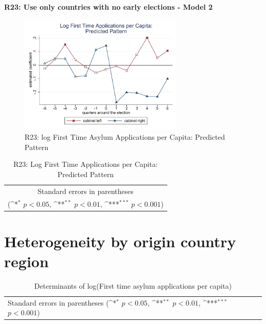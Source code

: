 \documentclass[10pt,a4paper]{scrartcl}
\begin{document}
\clearpage
\textbf{R23: Use only countries with no early elections - Model 2}
\begin{figure}[!ht]
	\centering
	\includegraphics[width=0.7\textwidth]{figures_edited/app_graph2_R23.pdf}
	\caption{R23: log First Time Asylum Applications per Capita: Predicted Pattern}
\end{figure}

\begin{table}[!ht]\centering
	\footnotesize
	\renewcommand{\arraystretch}{1.2}
	\def\sym#1{\ifmmode^{#1}\else\(^{#1}\)\fi}
	\caption{R23: Log First Time Applications per Capita: Predicted Pattern}
	\begin{tabular}{l*{2}{c}}
		\hline\hline
		
		\hline\hline
		\multicolumn{3}{c}{\footnotesize Standard errors in parentheses} \\
		\multicolumn{3}{c}{\footnotesize (\sym{*} \(p<0.05\), \sym{**} \(p<0.01\), \sym{***} \(p<0.001\))} \\
	\end{tabular}
\end{table}




\clearpage
\FloatBarrier
\section{Heterogeneity by origin country region}
\begin{table}[!ht]\centering
	\renewcommand{\arraystretch}{1.25}
	\small
	\def\sym#1{\ifmmode^{#1}\else\(^{#1}\)\fi}
	\caption{Determinants of log(First time asylum applications per capita)}
	\begin{tabular}{l*{4}{c}}
		\hline\hline
		
		\hline\hline
		\multicolumn{5}{l}{\footnotesize Standard errors in parentheses (\sym{*} \(p<0.05\), \sym{**} \(p<0.01\), \sym{***} \(p<0.001\))}\\
	\end{tabular}
\end{table}
\end{document}

